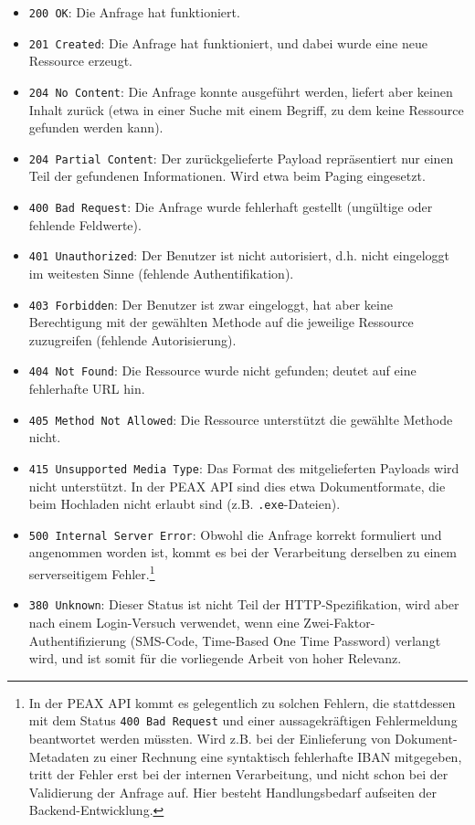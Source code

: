 \begin{itemize}
	\item \texttt{200 OK}: Die Anfrage hat funktioniert.
	\item \texttt{201 Created}: Die Anfrage hat funktioniert, und dabei wurde eine neue Ressource erzeugt.
	\item \texttt{204 No Content}: Die Anfrage konnte ausgeführt werden, liefert aber keinen Inhalt zurück (etwa in einer Suche mit einem Begriff, zu dem keine Ressource gefunden werden kann).
	\item \texttt{204 Partial Content}: Der zurückgelieferte Payload repräsentiert nur einen Teil der gefundenen Informationen. Wird etwa beim Paging eingesetzt.
	\item \texttt{400 Bad Request}: Die Anfrage wurde fehlerhaft gestellt (ungültige oder fehlende Feldwerte).
    \item \texttt{401 Unauthorized}: Der Benutzer ist nicht autorisiert, d.h. nicht eingeloggt im weitesten Sinne (fehlende Authentifikation).
    \item \texttt{403 Forbidden}: Der Benutzer ist zwar eingeloggt, hat aber keine Berechtigung mit der gewählten Methode auf die jeweilige Ressource zuzugreifen (fehlende Autorisierung).
	\item \texttt{404 Not Found}: Die Ressource wurde nicht gefunden; deutet auf eine fehlerhafte URL hin.
	\item \texttt{405 Method Not Allowed}: Die Ressource unterstützt die gewählte Methode nicht.
	\item \texttt{415 Unsupported Media Type}: Das Format des mitgelieferten Payloads wird nicht unterstützt. In der PEAX API sind dies etwa Dokumentformate, die beim Hochladen nicht erlaubt sind (z.B. \texttt{.exe}-Dateien).
	\item \texttt{500 Internal Server Error}: Obwohl die Anfrage korrekt formuliert und angenommen worden ist, kommt es bei der Verarbeitung derselben zu einem serverseitigem Fehler.\footnote{In der PEAX API kommt es gelegentlich zu solchen Fehlern, die stattdessen mit dem Status \texttt{400 Bad Request} und einer aussagekräftigen Fehlermeldung beantwortet werden müssten. Wird z.B. bei der Einlieferung von Dokument-Metadaten zu einer Rechnung eine syntaktisch fehlerhafte IBAN mitgegeben, tritt der Fehler erst bei der internen Verarbeitung, und nicht schon bei der Validierung der Anfrage auf. Hier besteht Handlungsbedarf aufseiten der Backend-Entwicklung.}
	\item \texttt{380 Unknown}: Dieser Status ist nicht Teil der HTTP-Spezifikation, wird aber nach einem Login-Versuch verwendet, wenn eine Zwei-Faktor-Authentifizierung (SMS-Code, Time-Based One Time Password) verlangt wird, und ist somit für die vorliegende Arbeit von hoher Relevanz.
\end{itemize}

